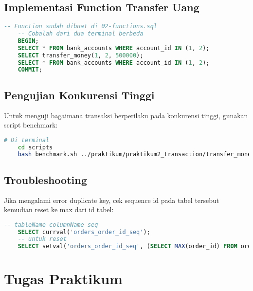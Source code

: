\subsection{Implementasi Function Transfer Uang}
\begin{lstlisting}[language=SQL]
	-- Function sudah dibuat di 02-functions.sql
	-- Cobalah dari dua terminal berbeda
	BEGIN;
	SELECT * FROM bank_accounts WHERE account_id IN (1, 2);
	SELECT transfer_money(1, 2, 500000);
	SELECT * FROM bank_accounts WHERE account_id IN (1, 2);
	COMMIT;
\end{lstlisting}

\subsection{Pengujian Konkurensi Tinggi}
Untuk menguji bagaimana transaksi berperilaku pada konkurensi tinggi, gunakan script benchmark:

\begin{lstlisting}[language=bash]
	# Di terminal
	cd scripts
	bash benchmark.sh ../praktikum/praktikum2_transaction/transfer_money.sql 20 100 10
\end{lstlisting}

\subsection{Troubleshooting}
Jika mengalami error duplicate key, cek sequence id pada tabel tersebut kemudian reset ke max dari id tabel:

\begin{lstlisting}[language=SQL]
	-- tableName_columnName_seq
	SELECT currval('orders_order_id_seq');
	-- untuk reset
	SELECT setval('orders_order_id_seq', (SELECT MAX(order_id) FROM orders));
\end{lstlisting}

\section{Tugas Praktikum}

